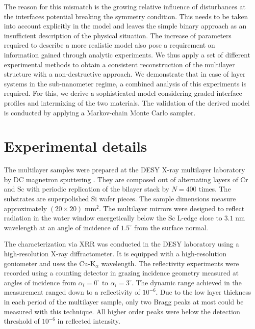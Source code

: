 \documentclass{iucr}              %
\begin{document}
The reason for this mismatch is the growing relative influence of disturbances at the interfaces potential breaking the symmetry condition. This needs to be taken into account explicitly in the model and leaves the simple binary approach as an insufficient description of the physical situation. The increase of parameters required to describe a more realistic model also pose a requirement on information gained through analytic experiments. We thus apply a set of different experimental methods to obtain a consistent reconstruction of the multilayer structure with a non-destructive approach. We demonstrate that in case of layer systems in the sub-nanometer regime, a combined analysis of this experiments is required. For this, we derive a sophisticated model considering graded interface profiles and intermixing of the two materials. The validation of the derived model is conducted by applying a Markov-chain Monte Carlo sampler.



\section{Experimental details} \label{sec:experimental}

The multilayer samples were prepared at the DESY X-ray multilayer laboratory by DC magnetron sputtering \cite{crsc_thermal_bajt} . They are composed out of alternating layers of Cr and Sc with periodic replication of the bilayer stack by $N=400$ times. The substrates are superpolished Si wafer pieces. The sample dimensions measure approximately $(20 \times 20)$ mm$^2$. The multilayer mirrors were designed to reflect radiation in the water window energetically below the Sc L-edge close to $3.1$ nm wavelength at an angle of incidence of $1.5^\circ$ from the surface normal.

The characterization via XRR was conducted in the DESY laboratory using a high-resolution X-ray diffractometer. It is equipped with a high-resolution goniometer and uses the Cu-K$_\alpha$ wavelength. The reflectivity experiments were recorded using a counting detector in grazing incidence geometry measured at angles of incidence from $\alpha_i=0^\circ$ to $\alpha_i=3^\circ$. The dynamic range achieved in the measurement ranged down to a reflectivity of $10^{-6}$. Due to the low layer thickness in each period of the multilayer sample, only two Bragg peaks at most could be measured with this technique. All higher order peaks were below the detection threshold of $10^{-6}$ in reflected intensity.
\end{document}

